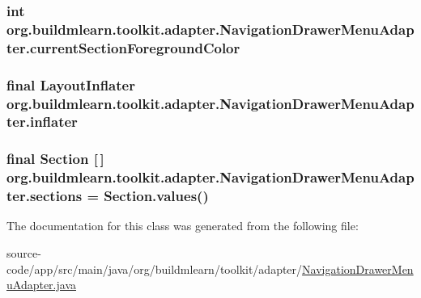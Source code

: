 \subsubsection[{\texorpdfstring{current\+Section\+Foreground\+Color}{currentSectionForegroundColor}}]{\setlength{\rightskip}{0pt plus 5cm}int org.\+buildmlearn.\+toolkit.\+adapter.\+Navigation\+Drawer\+Menu\+Adapter.\+current\+Section\+Foreground\+Color\hspace{0.3cm}{\ttfamily [private]}}\hypertarget{classorg_1_1buildmlearn_1_1toolkit_1_1adapter_1_1NavigationDrawerMenuAdapter_a930cdcd518fcdafd341e1ed6e114f01c}{}\label{classorg_1_1buildmlearn_1_1toolkit_1_1adapter_1_1NavigationDrawerMenuAdapter_a930cdcd518fcdafd341e1ed6e114f01c}
\subsubsection[{\texorpdfstring{inflater}{inflater}}]{\setlength{\rightskip}{0pt plus 5cm}final Layout\+Inflater org.\+buildmlearn.\+toolkit.\+adapter.\+Navigation\+Drawer\+Menu\+Adapter.\+inflater\hspace{0.3cm}{\ttfamily [private]}}\hypertarget{classorg_1_1buildmlearn_1_1toolkit_1_1adapter_1_1NavigationDrawerMenuAdapter_a18058870aed341d30bb308c1b98abfe6}{}\label{classorg_1_1buildmlearn_1_1toolkit_1_1adapter_1_1NavigationDrawerMenuAdapter_a18058870aed341d30bb308c1b98abfe6}
\subsubsection[{\texorpdfstring{sections}{sections}}]{\setlength{\rightskip}{0pt plus 5cm}final {\bf Section} \mbox{[}$\,$\mbox{]} org.\+buildmlearn.\+toolkit.\+adapter.\+Navigation\+Drawer\+Menu\+Adapter.\+sections = Section.\+values()\hspace{0.3cm}{\ttfamily [private]}}\hypertarget{classorg_1_1buildmlearn_1_1toolkit_1_1adapter_1_1NavigationDrawerMenuAdapter_a0e9b490e10fe5905cf66797f76314603}{}\label{classorg_1_1buildmlearn_1_1toolkit_1_1adapter_1_1NavigationDrawerMenuAdapter_a0e9b490e10fe5905cf66797f76314603}


The documentation for this class was generated from the following file\+:\begin{DoxyCompactItemize}
\item 
source-\/code/app/src/main/java/org/buildmlearn/toolkit/adapter/\hyperlink{NavigationDrawerMenuAdapter_8java}{Navigation\+Drawer\+Menu\+Adapter.\+java}\end{DoxyCompactItemize}
